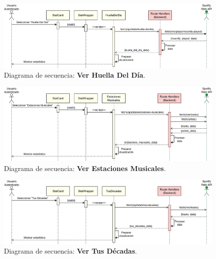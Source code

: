 \begin{figure}[H]
    \centering
    \includegraphics[width=\textwidth]{figures/diagramas_secuencia/ds_ver_huella_del_dia.png}
    \caption{Diagrama de secuencia: \textbf{Ver Huella Del Día}.}
    \label{fig:ds_ver_huella_del_dia}
\end{figure}

\begin{figure}[H]
    \centering
    \includegraphics[width=\textwidth]{figures/diagramas_secuencia/ds_ver_estaciones_musicales.png}
    \caption{Diagrama de secuencia: \textbf{Ver Estaciones Musicales}.}
    \label{fig:ds_ver_estaciones_musicales}
\end{figure}

\begin{figure}[H]
    \centering
    \includegraphics[width=\textwidth]{figures/diagramas_secuencia/ds_ver_tus_decadas.png}
    \caption{Diagrama de secuencia: \textbf{Ver Tus Décadas}.}
    \label{fig:ds_ver_tus_decadas}
\end{figure}

